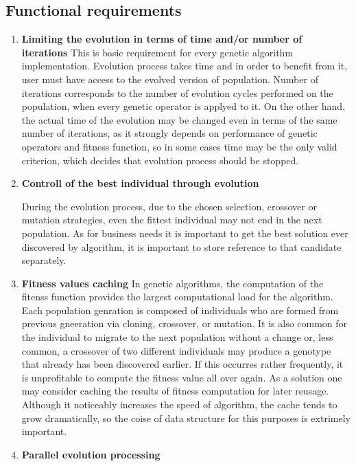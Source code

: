 \subsection{Functional requirements}
\begin{enumerate}
\item \textbf{Limiting the evolution in terms of time and/or number of iterations}
This is basic requirement for every genetic algorithm implementation. Evolution process takes time and in order to benefit from it, user must have access to the evolved version of population. Number of iterations corresponds to the number of evolution cycles performed on the population, when every genetic operator is applyed to it. On the other hand, the actual time of the evolution may be changed even in terms of the same number of iterations, as it strongly depends on performance of genetic operators and fitness function, so in some cases time may be the only valid criterion, which decides that evolution process should be stopped. 
\medbreak

\item \textbf{Controll of the best individual through evolution}

During the evolution process, due to the chosen selection, crossover or mutation strategies, even the fittest individual may not end in the next population. As for business needs it is important to get the best solution ever discovered by algorithm, it is important to store reference to that candidate separately.
\medbreak

\item \textbf{Fitness values caching}
In genetic algorithms, the computation of the fitenss function provides the largest computational load for the algorithm. Each population genration is composed of individuals who are formed from previous gneeration via cloning, crossover, or mutation. It is also common for the individual to migrate to the next population without a change or, less common, a crossover of two different individuals may produce a genotype that already has been discovered earlier. If this occurres rather frequently, it is unprofitable to compute the fitness value all over again. As a solution one may consider caching the results of fitness computation for later reusage. Although it noticeably increases the speed of algorithm, the cache tends to grow dramatically, so the coise of data structure for this purposes is extrimely important. 
\medbreak

\item \textbf{Parallel evolution processing}


\end{enumerate}
